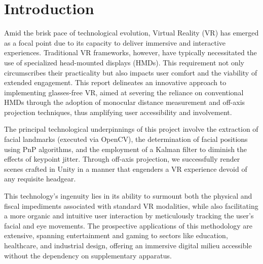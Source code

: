 \section {Introduction}
Amid the brisk pace of technological evolution, Virtual Reality (VR) has emerged as a focal point due to its capacity to deliver immersive and interactive experiences. Traditional VR frameworks, however, have typically necessitated the use of specialized head-mounted displays (HMDs). This requirement not only circumscribes their practicality but also impacts user comfort and the viability of extended engagement. This report delineates an innovative approach to implementing glasses-free VR, aimed at severing the reliance on conventional HMDs through the adoption of monocular distance measurement and off-axis projection techniques, thus amplifying user accessibility and involvement.

The principal technological underpinnings of this project involve the extraction of facial  landmarks (executed via OpenCV), the determination of facial positions using PnP algorithms, and the employment of a Kalman filter to diminish the effects of keypoint jitter. Through off-axis projection, we successfully render scenes crafted in Unity in a manner that engenders a VR experience devoid of any requisite headgear.

This technology's ingenuity lies in its ability to surmount both the physical and fiscal impediments associated with standard VR modalities, while also facilitating a more organic and intuitive user interaction by meticulously tracking the user’s facial and eye movements. The prospective applications of this methodology are extensive, spanning entertainment and gaming to sectors like education, healthcare, and industrial design, offering an immersive digital milieu accessible without the dependency on supplementary apparatus.
